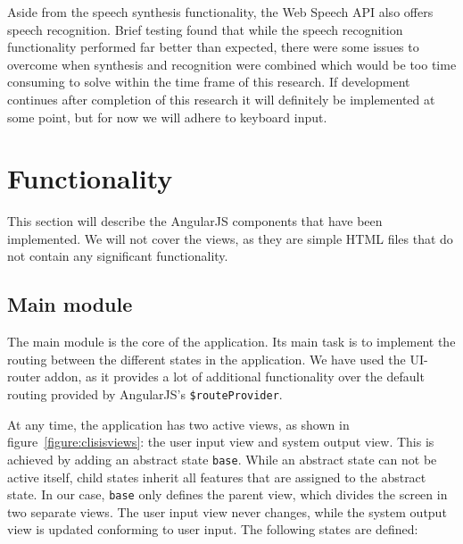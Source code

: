 Aside from the speech synthesis functionality, the Web Speech API also offers speech recognition. Brief testing found that while the speech recognition functionality performed far better than expected, there were some issues to overcome when synthesis and recognition were combined which would be too time consuming to solve within the time frame of this research. If development continues after completion of this research it will definitely be implemented at some point, but for now we will adhere to keyboard input.

\section{Functionality}
\label{section:functionality}
This section will describe the AngularJS components that have been implemented. We will not cover the views, as they are simple HTML files that do not contain any significant functionality.

\subsection{Main module}
\label{subsection:mainmodule}
The main module  is the core of the application. Its main task is to implement the routing between the different states in the application. We have used the UI-router addon\cite{angul39:online}, as it provides a lot of additional functionality over the default routing provided by AngularJS's \texttt{\$routeProvider}. 

At any time, the application has two active views, as shown in figure~\ref{figure:clisisviews}: the user input view and system output view. This is achieved by adding an abstract state \texttt{base}. While an abstract state can not be active itself, child states inherit all features that are assigned to the abstract state. In our case, \texttt{base} only defines the parent view, which divides the screen in two separate views. The user input view never changes, while the system output view is updated conforming to user input. The following states are defined:

